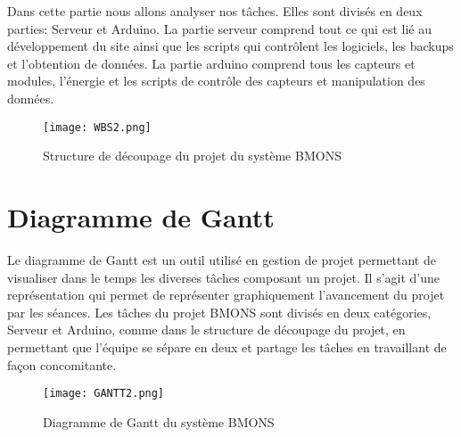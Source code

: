 Dans cette partie nous allons analyser nos tâches. Elles sont divisés en deux parties: Serveur et Arduino. La partie serveur comprend tout ce qui est lié au développement du site ainsi que les scripts qui contrôlent les logiciels, les backups et l'obtention de données. La partie arduino comprend tous les capteurs et modules, l'énergie et les scripts de contrôle des capteurs et manipulation des données.  


\begin{figure}[h!]
\centering\texttt{[image: WBS2.png]}
\caption{\label{fig:SDP} Structure de découpage du projet du système BMONS}
\end{figure}

\section{Diagramme de Gantt}

Le diagramme de Gantt est un outil utilisé en gestion de projet permettant de visualiser dans le temps les diverses tâches composant un projet. Il s'agit d'une représentation qui permet de représenter graphiquement l'avancement du projet par les séances. Les tâches du projet BMONS sont divisés en deux catégories, Serveur et Arduino, comme dans le structure de découpage du projet, en permettant que l'équipe se sépare en deux et partage les tâches en travaillant de façon concomitante.

\begin{figure}[h!]
\centering\texttt{[image: GANTT2.png]}
\caption{\label{fig:GANTT} Diagramme de Gantt du système BMONS}
\end{figure}


